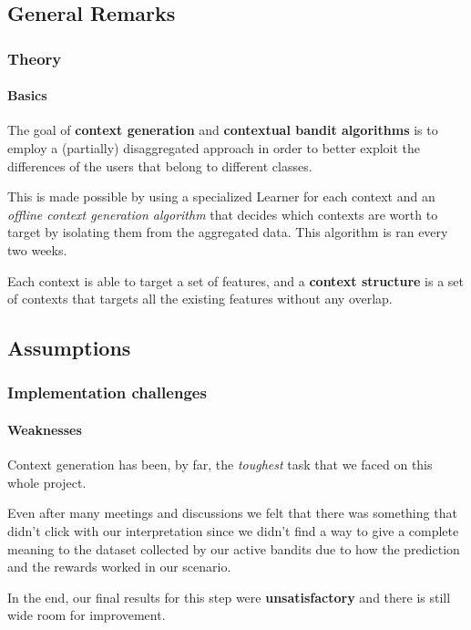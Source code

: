 
\subsection{General Remarks}


\begin{frame}

\frametitle{Theory}
\framesubtitle{Basics}

The goal of \textbf{context generation} and \textbf{contextual bandit algorithms} is to employ a (partially) disaggregated approach in order to better exploit the differences of the users that belong to different classes.

This is made possible by using a specialized Learner for each context and an \textit{offline context generation algorithm} that decides which contexts are worth to target by isolating them from the aggregated data. This algorithm is ran every two weeks.

Each context is able to target a set of features, and a \textbf{context structure} is a set of contexts that targets all the existing features without any overlap.

\end{frame}


\subsection{Assumptions}


\begin{frame}

\frametitle{Implementation challenges}
\framesubtitle{Weaknesses}

Context generation has been, by far, the \textit{toughest} task that we faced on this whole project.

Even after many meetings and discussions we felt that there was something that didn't click with our interpretation since we didn't find a way to give a complete meaning to the dataset collected by our active bandits due to how the prediction and the rewards worked in our scenario.

In the end, our final results for this step were \textbf{unsatisfactory} and there is still wide room for improvement.

\end{frame}

